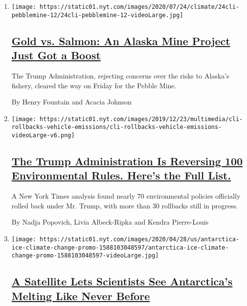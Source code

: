 \begin{enumerate}
\def\labelenumi{\arabic{enumi}.}
\item
  \texttt{[image: https://static01.nyt.com/images/2020/07/24/climate/24cli-pebblemine-12/24cli-pebblemine-12-videoLarge.jpg]}

  \hypertarget{gold-vs-salmon-an-alaska-mine-project-just-got-a-boost}{%
  \subsection{\texorpdfstring{\href{/2020/07/24/climate/pebble-mine-alaska-environment.html}{Gold
  vs. Salmon: An Alaska Mine Project Just Got a
  Boost}}{Gold vs. Salmon: An Alaska Mine Project Just Got a Boost}}\label{gold-vs-salmon-an-alaska-mine-project-just-got-a-boost}}

  The Trump Administration, rejecting concerns over the risks to
  Alaska's fishery, cleared the way on Friday for the Pebble Mine.

  By Henry Fountain and Acacia Johnson
\item
  \texttt{[image: https://static01.nyt.com/images/2019/12/23/multimedia/cli-rollbacks-vehicle-emissions/cli-rollbacks-vehicle-emissions-videoLarge-v6.png]}

  \hypertarget{the-trump-administration-is-reversing-100-environmental-rules-heres-the-full-list}{%
  \subsection{\texorpdfstring{\href{/interactive/2020/climate/trump-environment-rollbacks.html}{The
  Trump Administration Is Reversing 100 Environmental Rules. Here's the
  Full
  List.}}{The Trump Administration Is Reversing 100 Environmental Rules. Here's the Full List.}}\label{the-trump-administration-is-reversing-100-environmental-rules-heres-the-full-list}}

  A New York Times analysis found nearly 70 environmental policies
  officially rolled back under Mr. Trump, with more than 30 rollbacks
  still in progress.

  By Nadja Popovich, Livia Albeck-Ripka and Kendra Pierre-Louis
\item
  \texttt{[image: https://static01.nyt.com/images/2020/04/28/us/antarctica-ice-climate-change-promo-1588103048597/antarctica-ice-climate-change-promo-1588103048597-videoLarge.jpg]}

  \hypertarget{a-satellite-lets-scientists-see-antarcticas-melting-like-never-before}{%
  \subsection{\texorpdfstring{\href{/interactive/2020/04/30/climate/antarctica-ice-climate-change.html}{A
  Satellite Lets Scientists See Antarctica's Melting Like Never
  Before}}{A Satellite Lets Scientists See Antarctica's Melting Like Never Before}}\label{a-satellite-lets-scientists-see-antarcticas-melting-like-never-before}}


\end{enumerate}
